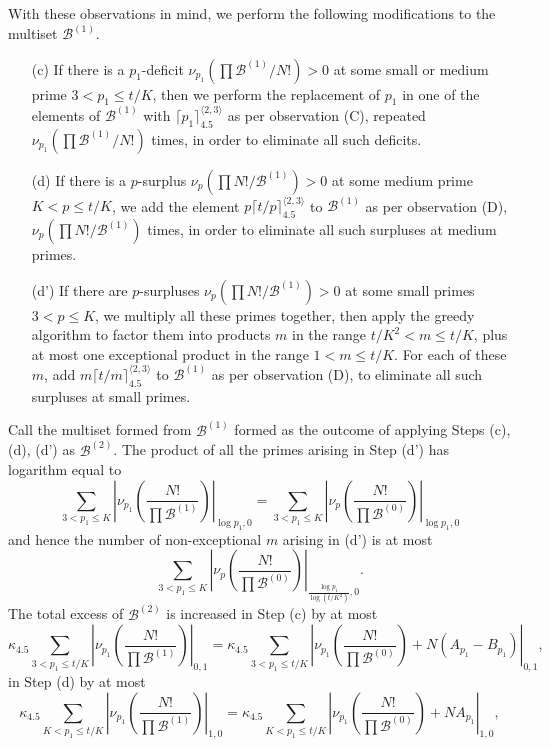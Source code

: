 \documentclass[12pt,a4paper,reqno]{amsart}
\numberwithin{equation}{section}
\theoremstyle{plain}
\theoremstyle{definition}
\newcommand\tuple{{\mathcal B}}
\begin{document}
With these observations in mind, we perform the following modifications to the multiset $\tuple^{(1)}$.
\begin{itemize}
\item[(c)] If there is a $p_1$-deficit $\nu_{p_1}(\prod \tuple^{(1)}/N!) > 0$ at some small or medium prime $3 < p_1 \leq t/K$, then we perform the replacement of $p_1$ in one of the elements of $\tuple^{(1)}$ with $\lceil p_1 \rceil^{\langle 2,3\rangle}_{4.5}$ as per observation (C), repeated $\nu_{p_1}(\prod \tuple^{(1)}/N!)$ times, in order to eliminate all such deficits.
\item[(d)] If there is a $p$-surplus $\nu_p(\prod N!/\tuple^{(1)}) > 0$ at some medium prime $K < p \leq t/K$, we add the element 
$p \lceil t/p \rceil^{\langle 2,3 \rangle}_{4.5}$ to $\tuple^{(1)}$ as per observation (D), $\nu_p(\prod N!/\tuple^{(1)})$ times, in order to eliminate all such surpluses at medium primes.
\item[(d')] If there are $p$-surpluses $\nu_p(\prod N!/\tuple^{(1)}) > 0$ at some small primes $3 < p \leq K$, we multiply all these primes together, then apply the greedy algorithm to factor them into products $m$ in the range $t/K^2 < m \leq t/K$, plus at most one exceptional product in the range $1 < m \leq t/K$.  For each of these $m$, add $m \lceil t/m \rceil^{\langle 2,3 \rangle}_{4.5}$ to $\tuple^{(1)}$ as per observation (D), to eliminate all such surpluses at small primes.
\end{itemize}
Call the multiset formed from $\tuple^{(1)}$ formed as the outcome of applying Steps (c), (d), (d') as $\tuple^{(2)}$.  The product of all the primes arising in Step (d') has logarithm equal to
$$ \sum_{3 < p_1 \leq K} \left|\nu_{p_1}\left( \frac{N!}{\prod \tuple^{(1)}} \right) \right|_{\log p_1,0} = \sum_{3 < p_1 \leq K} \left|\nu_p\left( \frac{N!}{\prod \tuple^{(0)}} \right) \right|_{\log p_1,0}$$
and hence the number of non-exceptional $m$ arising in (d') is at most
$$ \sum_{3 < p_1 \leq K} \left|\nu_p\left( \frac{N!}{\prod \tuple^{(0)}} \right) \right|_{\frac{\log p_1}{\log(t/K^2)},0}.$$
The total excess of $\tuple^{(2)}$ is increased in Step (c) by at most
$$ \kappa_{4.5} \sum_{3 < p_1 \leq t/K} \left|\nu_{p_1}\left( \frac{N!}{\prod \tuple^{(1)}} \right) \right|_{0,1}
=  \kappa_{4.5} \sum_{3 < p_1 \leq t/K} \left|\nu_{p_1}\left( \frac{N!}{\prod \tuple^{(0)}} \right) + N(A_{p_1} - B_{p_1}) \right|_{0,1},$$
in Step (d) by at most
$$ \kappa_{4.5} \sum_{K < p_1 \leq t/K} \left|\nu_{p_1}\left( \frac{N!}{\prod \tuple^{(1)}} \right) \right|_{1,0}
=  \kappa_{4.5} \sum_{K < p_1 \leq t/K} \left|\nu_{p_1}\left( \frac{N!}{\prod \tuple^{(0)}} \right) + NA_{p_1} \right|_{1,0},$$
\end{document}
